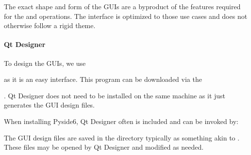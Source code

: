 \documentclass[letterpaper,11pt,english]{sphinxmanual}
\begin{document}
\sphinxAtStartPar
The exact shape and form of the GUIs are a byproduct of the features required
for the {\hyperref[\detokenize{user/manual_mode:user-manual-mode}]{}} and {\hyperref[\detokenize{user/automatic_mode:user-automatic-mode}]{}} operations.
The interface is optimized to those use cases and does not otherwise follow
a rigid theme.


\paragraph{Qt Designer}
\label{\detokenize{technical/architecture/graphical_user_interface:qt-designer}}
\sphinxAtStartPar
To design the GUIs, we use
%
\begin{footnote}[58]\sphinxAtStartFootnote
{}
%
\end{footnote} as it is an
easy interface. This program can be downloaded via the
%
\begin{footnote}[59]\sphinxAtStartFootnote
{}
%
\end{footnote}.
Qt Designer does not need to be installed on the same machine as it just
generates the GUI design files.

\sphinxAtStartPar
When installing Pyside6, Qt Designer often is included and can be invoked by:

\begin{sphinxVerbatim}[commandchars=\\\{\}]
\end{sphinxVerbatim}

\sphinxAtStartPar
The GUI design files are saved in the
 directory typically as
something akin to . These files may be opened by Qt Designer
and modified as needed.
\end{document}
